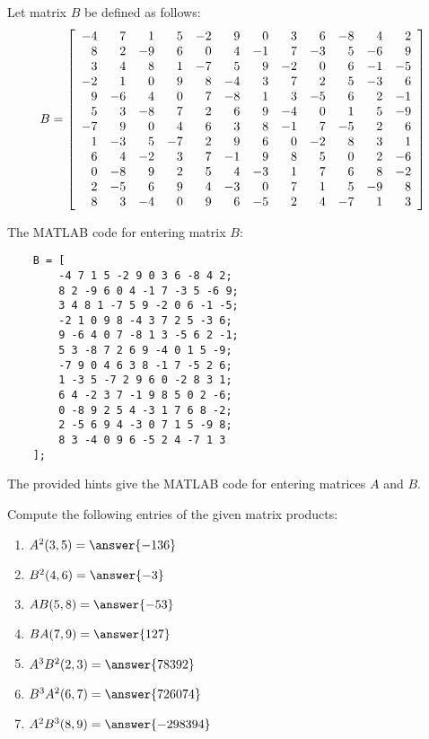 \documentclass{ximera}
\begin{document}
\begin{problem}
    Let matrix \( B \) be defined as follows:
    \[
    B = \startmat{rrrrrrrrrrrr}
        -4 & 7 & 1 & 5 & -2 & 9 & 0 & 3 & 6 & -8 & 4 & 2 \\
        8 & 2 & -9 & 6 & 0 & 4 & -1 & 7 & -3 & 5 & -6 & 9 \\
        3 & 4 & 8 & 1 & -7 & 5 & 9 & -2 & 0 & 6 & -1 & -5 \\
        -2 & 1 & 0 & 9 & 8 & -4 & 3 & 7 & 2 & 5 & -3 & 6 \\
        9 & -6 & 4 & 0 & 7 & -8 & 1 & 3 & -5 & 6 & 2 & -1 \\
        5 & 3 & -8 & 7 & 2 & 6 & 9 & -4 & 0 & 1 & 5 & -9 \\
        -7 & 9 & 0 & 4 & 6 & 3 & 8 & -1 & 7 & -5 & 2 & 6 \\
        1 & -3 & 5 & -7 & 2 & 9 & 6 & 0 & -2 & 8 & 3 & 1 \\
        6 & 4 & -2 & 3 & 7 & -1 & 9 & 8 & 5 & 0 & 2 & -6 \\
        0 & -8 & 9 & 2 & 5 & 4 & -3 & 1 & 7 & 6 & 8 & -2 \\
        2 & -5 & 6 & 9 & 4 & -3 & 0 & 7 & 1 & 5 & -9 & 8 \\
        8 & 3 & -4 & 0 & 9 & 6 & -5 & 2 & 4 & -7 & 1 & 3
    \stopmat
    \]
    
    \begin{hint}
    The MATLAB code for entering matrix \( B \):
    \begin{verbatim}
    B = [
        -4 7 1 5 -2 9 0 3 6 -8 4 2;
        8 2 -9 6 0 4 -1 7 -3 5 -6 9;
        3 4 8 1 -7 5 9 -2 0 6 -1 -5;
        -2 1 0 9 8 -4 3 7 2 5 -3 6;
        9 -6 4 0 7 -8 1 3 -5 6 2 -1;
        5 3 -8 7 2 6 9 -4 0 1 5 -9;
        -7 9 0 4 6 3 8 -1 7 -5 2 6;
        1 -3 5 -7 2 9 6 0 -2 8 3 1;
        6 4 -2 3 7 -1 9 8 5 0 2 -6;
        0 -8 9 2 5 4 -3 1 7 6 8 -2;
        2 -5 6 9 4 -3 0 7 1 5 -9 8;
        8 3 -4 0 9 6 -5 2 4 -7 1 3
    ];
    \end{verbatim}
    \end{hint}

The provided hints give the MATLAB code for entering matrices \( A \) and \( B \).

Compute the following entries of the given matrix products:


\begin{enumerate}

\item $A^2(3,5)=\answer{-136}$
\item $B^2(4,6)=\answer{-3}$
\item $AB(5,8)=\answer{-53}$
\item $BA(7,9)=\answer{127}$
\item $A^3B^2(2,3)=\answer{78392}$
\item $B^3A^2(6,7)=\answer{726074}$
\item $A^2B^3(8,9)=\answer{-298394}$

\end{enumerate}
    

\end{problem}
\end{document}
